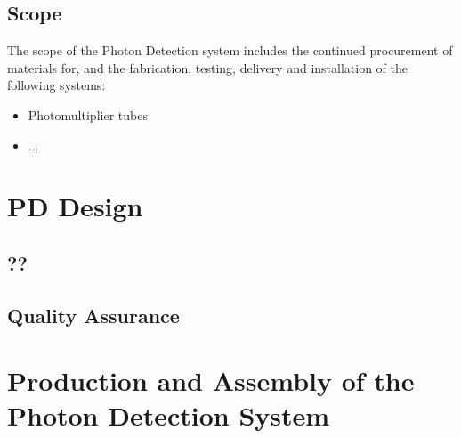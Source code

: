 

\subsection{Scope}
\label{sec:fddp-pd-scope}

The scope of the Photon Detection system includes the continued procurement of materials for, and the fabrication, testing, delivery and installation of the following systems: 


\begin{itemize}
\item Photomultiplier tubes 
\item  ...
\end{itemize}



\section{PD Design}
\label{sec:fddp-pd-design}




\subsection{??}
\label{sec:fddp-pd-??}

\subsection{Quality Assurance}
\label{sec:fddp-pd-qa}




\section{Production and Assembly of the Photon Detection System}
\label{sec:fddp-pd-prod-assy}

